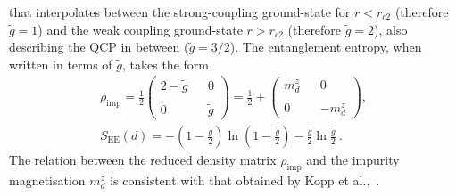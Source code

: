 that interpolates between the strong-coupling ground-state for \(r < r_{c2}\) (therefore \(\tilde g = 1\)) and the weak coupling ground-state \(r > r_{c2}\) (therefore \(\tilde g = 2\)), also describing the QCP in between (\(\tilde g = 3/2\)). The entanglement entropy, when written in terms of \(\tilde g\), takes the form
\begin{eqnarray}
	\rho_\text{imp} = \frac{1}{2}\begin{pmatrix} 2-\tilde g && 0 \\ \\ 0 && \tilde g \end{pmatrix} = \frac{1}{2} + \begin{pmatrix} m_d^z && 0 \\ \\ 0 && -m_d^z \end{pmatrix},\\
	S_\text{EE}(d) = -\left( 1 - \frac{\tilde g}{2} \right) \ln \left( 1 - \frac{\tilde g}{2} \right) - \frac{\tilde g}{2}\ln \frac{\tilde g}{2} ~.
\end{eqnarray}
The relation between the reduced density matrix \(\rho_\text{imp}\) and the impurity magnetisation \(m_d^z\) is consistent with that obtained by Kopp et al.,~\cite{kopp_chakravarty_2007}.


